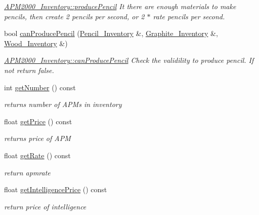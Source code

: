 \begin{DoxyCompactItemize}
\begin{DoxyCompactList}\small\item\em \mbox{\hyperlink{classAPM2000__Inventory_ad7ffc7e7536509d26d76800b2398bfc0}{A\+P\+M2000\+\_\+\+Inventory\+::produce\+Pencil}} It there are enough materials to make pencils, then create 2 pencils per second, or 2 $\ast$ rate pencils per second. \end{DoxyCompactList}\item 
bool \mbox{\hyperlink{classAPM2000__Inventory_a57eae269c4c67d3133175d6006373d2b}{can\+Produce\+Pencil}} (\mbox{\hyperlink{classPencil__Inventory}{Pencil\+\_\+\+Inventory}} \&, \mbox{\hyperlink{classGraphite__Inventory}{Graphite\+\_\+\+Inventory}} \&, \mbox{\hyperlink{classWood__Inventory}{Wood\+\_\+\+Inventory}} \&)
\begin{DoxyCompactList}\small\item\em \mbox{\hyperlink{classAPM2000__Inventory_a57eae269c4c67d3133175d6006373d2b}{A\+P\+M2000\+\_\+\+Inventory\+::can\+Produce\+Pencil}} Check the validility to produce pencil. If not return false. \end{DoxyCompactList}\item 
int \mbox{\hyperlink{classAPM2000__Inventory_a9a9bacffea28885b6c268d9a3bcab401}{get\+Number}} () const
\begin{DoxyCompactList}\small\item\em returns number of A\+P\+Ms in inventory \end{DoxyCompactList}\item 
float \mbox{\hyperlink{classAPM2000__Inventory_a65388780b7aa2066cfaf86c85d501765}{get\+Price}} () const
\begin{DoxyCompactList}\small\item\em returns price of A\+PM \end{DoxyCompactList}\item 
float \mbox{\hyperlink{classAPM2000__Inventory_a989cd77e09fcdc6bb6a6b9e5d2e6f481}{get\+Rate}} () const
\begin{DoxyCompactList}\small\item\em return apmrate \end{DoxyCompactList}\item 
float \mbox{\hyperlink{classAPM2000__Inventory_af68c4aa1dea90188b7837de90d6be1bc}{get\+Intelligence\+Price}} () const
\begin{DoxyCompactList}\small\item\em return price of intelligence \end{DoxyCompactList}\item 

\end{DoxyCompactItemize}
